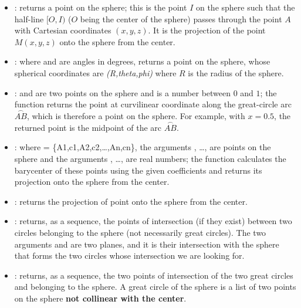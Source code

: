 \begin{itemize}
    \item {}: returns a point on the sphere; this is the point $I$ on the sphere such that the half-line $[O,I)$ ($O$ being the center of the sphere) passes through the point $A$ with Cartesian coordinates $(x,y,z)$. It is the projection of the point $M(x,y,z)$ onto the sphere from the center.
    
    \item {}: where  and  are angles in degrees, returns a point on the sphere, whose spherical coordinates are \emph{(R,theta,phi)} where $R$ is the radius of the sphere.
    
    \item {} :  and  are two points on the sphere and  is a number between $0$ and $1$; the function returns the point at curvilinear coordinate  along the great-circle arc $\overset{\frown}{AB}$, which is therefore a point on the sphere. For example, with $x=0.5$, the returned point is the midpoint of the arc $\overset{\frown}{AB}$.

    \item {} : where  = \{A1,c1,A2,c2,\ldots,An,cn\}, the arguments , \ldots, are points on the sphere and the arguments , \ldots, are real numbers; the function calculates the barycenter of these points using the given coefficients and returns its projection onto the sphere from the center.
    
    \item {}: returns the projection of point  onto the sphere from the center.
    
    \item {}: returns, as a sequence, the points of intersection (if they exist) between two circles belonging to the sphere (not necessarily great circles). The two arguments  and  are two planes, and it is their intersection with the sphere that forms the two circles whose intersection we are looking for.
    
    \item {}: returns, as a sequence, the two points of intersection of the two great circles  and  belonging to the sphere. A great circle of the sphere is a list of two points on the sphere \textbf{not collinear with the center}.
    

\end{itemize}
